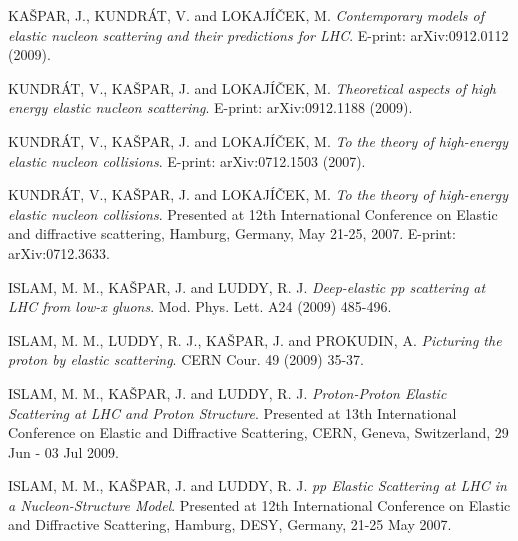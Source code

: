 \> KAŠPAR, J., KUNDRÁT, V. and LOKAJÍČEK, M. {\it Contemporary models of elastic nucleon scattering and their predictions for LHC}. E-print: arXiv:0912.0112 (2009).

\> KUNDRÁT, V., KAŠPAR, J. and LOKAJÍČEK, M. {\it Theoretical aspects of high energy elastic nucleon scattering}. E-print: arXiv:0912.1188 (2009).

\> KUNDRÁT, V., KAŠPAR, J. and LOKAJÍČEK, M. {\it To the theory of high-energy elastic nucleon collisions}. E-print: arXiv:0712.1503 (2007).

\> KUNDRÁT, V., KAŠPAR, J. and LOKAJÍČEK, M. {\it To the theory of high-energy elastic nucleon collisions}. Presented at 12th International Conference on Elastic and diffractive scattering, Hamburg, Germany, May 21-25, 2007. E-print: arXiv:0712.3633.


\> ISLAM, M. M., KAŠPAR, J. and LUDDY, R. J. {\it Deep-elastic pp scattering at LHC from low-x gluons}. Mod. Phys. Lett. A24 (2009) 485-496.

\> ISLAM, M. M., LUDDY, R. J., KAŠPAR, J. and PROKUDIN, A. {\it Picturing the proton by elastic scattering}. CERN Cour. 49 (2009) 35-37.
	
\> ISLAM, M. M., KAŠPAR, J. and LUDDY, R. J. {\it Proton-Proton Elastic Scattering at LHC and Proton Structure}. Presented at 13th International Conference on Elastic and Diffractive Scattering, CERN, Geneva, Switzerland, 29 Jun - 03 Jul 2009.

\> ISLAM, M. M., KAŠPAR, J. and LUDDY, R. J. {\it pp Elastic Scattering at LHC in a Nucleon-Structure Model}. Presented at 12th International Conference on Elastic and Diffractive Scattering, Hamburg, DESY, Germany, 21-25 May 2007.

\bye
